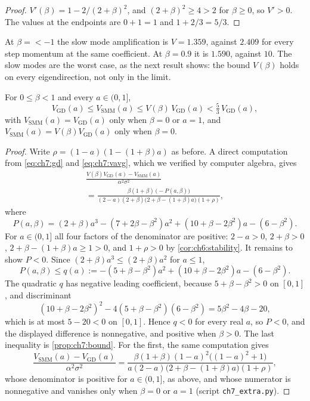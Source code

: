 \begin{proof}
$V'(\beta)=1-2/(2+\beta)^2$, and $(2+\beta)^2\ge4>2$ for $\beta\ge0$, so
$V'>0$. The values at the endpoints are $0+1=1$ and $1+2/3=5/3$.
\end{proof}

At $\beta=\lt-1$ the slow mode amplification is $V=1.359$, against $2.409$ for
every step momentum at the same coefficient. At $\beta=0.9$ it is $1.590$,
against $10$. The slow modes are the worst case, as the next result shows: the
bound $V(\beta)$ holds on every eigendirection, not only in the limit.

\begin{proposition}\label{prop:ch7:uniform}
For $0\le\beta<1$ and every $a\in(0,1]$,
\[
  V_{\mathrm{GD}}(a)\le V_{\mathrm{SMM}}(a)\le V(\beta)\,V_{\mathrm{GD}}(a)<\tfrac53\,V_{\mathrm{GD}}(a),
\]
with $V_{\mathrm{SMM}}(a)=V_{\mathrm{GD}}(a)$ only when $\beta=0$ or $a=1$, and $V_{\mathrm{SMM}}(a)=V(\beta)V_{\mathrm{GD}}(a)$ only when $\beta=0$.
\end{proposition}

\begin{proof}
Write $\rho=(1-a)(1-(1+\beta)a)$ as before. A direct computation from
\eqref{eq:ch7:gd} and \eqref{eq:ch7:vavg}, which we verified by computer
algebra, gives
\begin{multline*}
  \frac{V(\beta)V_{\mathrm{GD}}(a)-V_{\mathrm{SMM}}(a)}{\alpha^2\sigma^2}\\
  =\frac{\beta(1+\beta)\,\bigl(-P(a,\beta)\bigr)}
  {(2-a)(2+\beta)\bigl(2+\beta-(1+\beta)a\bigr)(1+\rho)},
\end{multline*}
where
\[
  P(a,\beta)=(2+\beta)a^3-(7+2\beta-\beta^2)a^2+(10+\beta-2\beta^2)a-(6-\beta^2).
\]
For $a\in(0,1]$ all four factors of the denominator are positive: $2-a>0$,
$2+\beta>0$, $2+\beta-(1+\beta)a\ge1>0$, and $1+\rho>0$ by
\cref{cor:ch6:stability}. It remains to show $P<0$. Since
$(2+\beta)a^3\le(2+\beta)a^2$ for $a\le1$,
\[
  P(a,\beta)\le q(a):=-(5+\beta-\beta^2)a^2+(10+\beta-2\beta^2)a-(6-\beta^2).
\]
The quadratic $q$ has negative leading coefficient, because $5+\beta-\beta^2>0$
on $[0,1]$, and discriminant
\[
  (10+\beta-2\beta^2)^2-4(5+\beta-\beta^2)(6-\beta^2)=5\beta^2-4\beta-20,
\]
which is at most $5-20<0$ on $[0,1]$.
Hence $q<0$ for every real $a$, so $P<0$, and the displayed difference is
nonnegative, and positive when $\beta>0$.
The last inequality is \cref{prop:ch7:bound}.
For the first, the same computation gives
\[
  \frac{V_{\mathrm{SMM}}(a)-V_{\mathrm{GD}}(a)}{\alpha^2\sigma^2}
  =\frac{\beta(1+\beta)(1-a)^2\bigl((1-a)^2+1\bigr)}{a(2-a)\bigl(2+\beta-(1+\beta)a\bigr)(1+\rho)},
\]
whose denominator is positive for $a\in(0,1]$, as above, and whose numerator is nonnegative and vanishes only when $\beta=0$ or $a=1$ (script \texttt{ch7\_extra.py}).
\end{proof}

